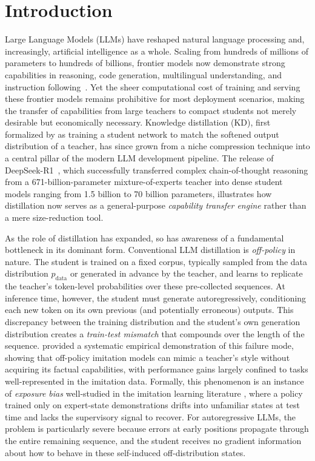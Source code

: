 \documentclass{article} %
\newcommand{\pdata}{p_{\mathrm{data}}}
\begin{document}
\section{Introduction}
\label{sec:intro}

Large Language Models (LLMs) have reshaped natural language processing and, increasingly, artificial intelligence as a whole. Scaling from hundreds of millions of parameters to hundreds of billions, frontier models now demonstrate strong capabilities in reasoning, code generation, multilingual understanding, and instruction following~\citep{2505.09388,2501.12948,2408.00118}. Yet the sheer computational cost of training and serving these frontier models remains prohibitive for most deployment scenarios, making the transfer of capabilities from large teachers to compact students not merely desirable but economically necessary. Knowledge distillation (KD), first formalized by \citet{hinton2015distilling} as training a student network to match the softened output distribution of a teacher, has since grown from a niche compression technique into a central pillar of the modern LLM development pipeline. The release of DeepSeek-R1~\citep{2501.12948}, which successfully transferred complex chain-of-thought reasoning from a 671-billion-parameter mixture-of-experts teacher into dense student models ranging from 1.5 billion to 70 billion parameters, illustrates how distillation now serves as a general-purpose \textit{capability transfer engine} rather than a mere size-reduction tool.

As the role of distillation has expanded, so has awareness of a fundamental bottleneck in its dominant form. Conventional LLM distillation is \textit{off-policy} in nature. The student is trained on a fixed corpus, typically sampled from the data distribution $\pdata$ or generated in advance by the teacher, and learns to replicate the teacher's token-level probabilities over these pre-collected sequences. At inference time, however, the student must generate autoregressively, conditioning each new token on its own previous (and potentially erroneous) outputs. This discrepancy between the training distribution and the student's own generation distribution creates a \textit{train-test mismatch} that compounds over the length of the sequence. \citet{2305.15717} provided a systematic empirical demonstration of this failure mode, showing that off-policy imitation models can mimic a teacher's style without acquiring its factual capabilities, with performance gains largely confined to tasks well-represented in the imitation data. Formally, this phenomenon is an instance of \textit{exposure bias} well-studied in the imitation learning literature \citep{ross2011reduction}, where a policy trained only on expert-state demonstrations drifts into unfamiliar states at test time and lacks the supervisory signal to recover. For autoregressive LLMs, the problem is particularly severe because errors at early positions propagate through the entire remaining sequence, and the student receives no gradient information about how to behave in these self-induced off-distribution states.
\end{document}
